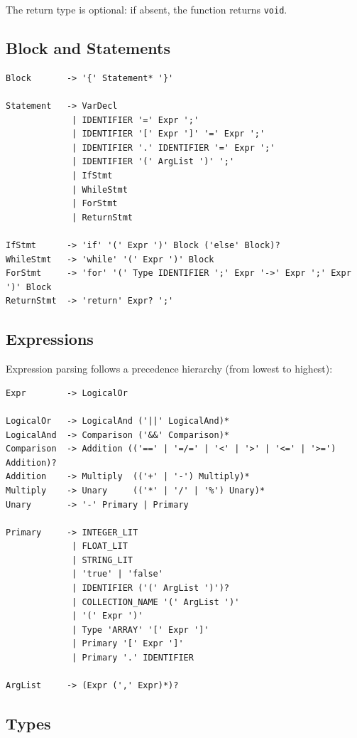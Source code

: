 \documentclass[12pt,a4paper]{article}
\begin{document}
The return type is optional: if absent, the function returns \texttt{void}.

\subsection{Block and Statements}

\begin{lstlisting}[style=grammar]
Block       -> '{' Statement* '}'

Statement   -> VarDecl
             | IDENTIFIER '=' Expr ';'
             | IDENTIFIER '[' Expr ']' '=' Expr ';'
             | IDENTIFIER '.' IDENTIFIER '=' Expr ';'
             | IDENTIFIER '(' ArgList ')' ';'
             | IfStmt
             | WhileStmt
             | ForStmt
             | ReturnStmt

IfStmt      -> 'if' '(' Expr ')' Block ('else' Block)?
WhileStmt   -> 'while' '(' Expr ')' Block
ForStmt     -> 'for' '(' Type IDENTIFIER ';' Expr '->' Expr ';' Expr ')' Block
ReturnStmt  -> 'return' Expr? ';'
\end{lstlisting}

\subsection{Expressions}

Expression parsing follows a precedence hierarchy (from lowest to highest):

\begin{lstlisting}[style=grammar]
Expr        -> LogicalOr

LogicalOr   -> LogicalAnd ('||' LogicalAnd)*
LogicalAnd  -> Comparison ('&&' Comparison)*
Comparison  -> Addition (('==' | '=/=' | '<' | '>' | '<=' | '>=') Addition)?
Addition    -> Multiply  (('+' | '-') Multiply)*
Multiply    -> Unary     (('*' | '/' | '%') Unary)*
Unary       -> '-' Primary | Primary

Primary     -> INTEGER_LIT
             | FLOAT_LIT
             | STRING_LIT
             | 'true' | 'false'
             | IDENTIFIER ('(' ArgList ')')?
             | COLLECTION_NAME '(' ArgList ')'
             | '(' Expr ')'
             | Type 'ARRAY' '[' Expr ']'
             | Primary '[' Expr ']'
             | Primary '.' IDENTIFIER

ArgList     -> (Expr (',' Expr)*)?
\end{lstlisting}

\subsection{Types}
\end{document}
